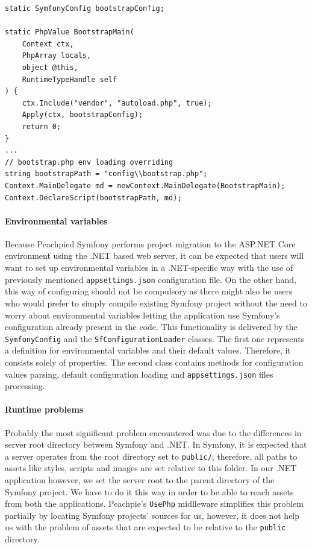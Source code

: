 \begin{center}
\begin{lstlisting}[caption={Context file mapping overriding},captionpos=b]
static SymfonyConfig bootstrapConfig;

static PhpValue BootstrapMain(
	Context ctx,
	PhpArray locals,
	object @this,
	RuntimeTypeHandle self
) {
	ctx.Include("vendor", "autoload.php", true);
	Apply(ctx, bootstrapConfig);
	return 0;
}
...
// bootstrap.php env loading overriding
string bootstrapPath = "config\\bootstrap.php";
Context.MainDelegate md = newContext.MainDelegate(BootstrapMain);
Context.DeclareScript(bootstrapPath, md);
\end{lstlisting}
\end{center}


\paragraph{Environmental variables} Because Peachpied Symfony performs project migration to the ASP.NET Core environment using the .NET based web server, it can be expected that users will want to set up environmental variables in a .NET-specific way with the use of previously mentioned \texttt{appsettings.json} configuration file. On the other hand, this way of configuring should not be compulsory as there might also be users who would prefer to simply compile existing Symfony project without the need to worry about environmental variables letting the application use Symfony's configuration already present in the code. This functionality is delivered by the \texttt{SymfonyConfig} and the \texttt{SfConfigurationLoader} classes. The first one represents a definition for environmental variables and their default values. Therefore, it consists solely of properties. The second class contains methods for configuration values parsing, default configuration loading and \texttt{appsettings.json} files processing.


\paragraph{Runtime problems} Probably the most significant problem encountered was due to the differences in server root directory between Symfony and .NET. In Symfony, it is expected that a server operates from the root directory set to \texttt{public/}, therefore, all paths to assets like styles, scripts and images are set relative to this folder. In our .NET application however, we set the server root to the parent directory of the Symfony project. We have to do it this way in order to be able to reach assets from both the applications. Peachpie's \texttt{UsePhp} midlleware simplifies this problem partially by locating Symfony projects' sources for us, however, it does not help us with the problem of assets that are expected to be relative to the \texttt{public} directory.

